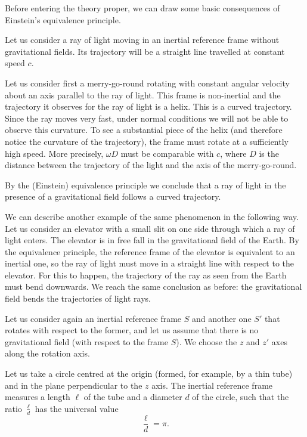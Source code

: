 \begin{points}
\item Before entering the theory proper, we can draw some basic consequences of Einstein's equivalence principle.

\item Let us consider a ray of light moving in an inertial reference frame without gravitational fields. Its trajectory will be a straight line travelled at constant speed $c$.

\item Let us consider first a merry-go-round rotating with constant angular velocity about an axis parallel to the ray of light. This frame is non-inertial and the trajectory it observes for the ray of light is a helix. This is a curved trajectory. Since the ray moves very fast, under normal conditions we will not be able to observe this curvature. To see a substantial piece of the helix (and therefore notice the curvature of the trajectory), the frame must rotate at a sufficiently high speed. More precisely, $\omega D$ must be comparable with $c$, where $D$ is the distance between the trajectory of the light and the axis of the merry-go-round.

\item By the (Einstein) equivalence principle we conclude that a ray of light in the presence of a gravitational field follows a curved trajectory.

\item We can describe another example of the same phenomenon in the following way. Let us consider an elevator with a small slit on one side through which a ray of light enters. The elevator is in free fall in the gravitational field of the Earth. By the equivalence principle, the reference frame of the elevator is equivalent to an inertial one, so the ray of light must move in a straight line with respect to the elevator. For this to happen, the trajectory of the ray as seen from the Earth must bend downwards. We reach the same conclusion as before: the gravitational field bends the trajectories of light rays.

\item Let us consider again an inertial reference frame $S$ and another one $S'$ that rotates with respect to the former, and let us assume that there is no gravitational field (with respect to the frame $S$). We choose the $z$ and $z'$ axes along the rotation axis.

\item Let us take a circle centred at the origin (formed, for example, by a thin tube) and in the plane perpendicular to the $z$ axis. The inertial reference frame measures a length $\ell$ of the tube and a diameter $d$ of the circle, such that the ratio $\frac\ell d$ has the universal value
\[
  \frac\ell d=\pi .
\]


\end{points}
